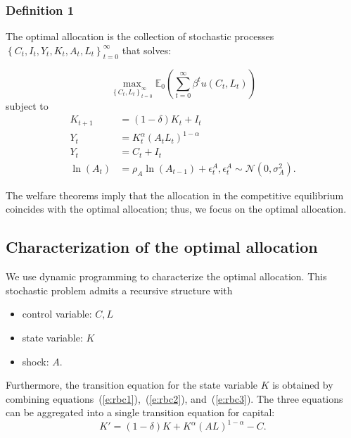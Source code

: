 \documentclass{article}
\begin{document}
\subsubsection*{Definition 1} The optimal allocation is the collection of stochastic processes $\left\lbrace C_{t},I_{t},Y_{t},K_{t},A_{t},L_{t}\right\rbrace _{t=0}^{\infty}$ that solves:

\[
\max_{\left\lbrace C_{t},L_{t}\right\rbrace _{t=0}^{\infty}} \mathbb{E}_{0}\left(\sum_{t=0}^{\infty}\beta^{t} u(C_{t},L_{t})\right)
\]
subject to
\wcSpan*[id=equation-23]{}
\setcounter{tpequation}{22}\label{e:rbc1}
\setcounter{tpequation}{23}\label{e:rbc2}
\setcounter{tpequation}{24}\label{e:rbc3}
\[
\begin{align*}
K_{t+1} &=(1-\delta) K_{t}+I_{t}\tag{23}\\
Y_{t}&=K_{t}^{\alpha} \left(A_{t} L_{t}\right)^{1-\alpha}\tag{24}\\
Y_{t}&=C_{t}+I_{t}\tag{25}\\
\ln\left(A_{t}\right) &=\rho_{A} \ln\left(A_{t-1}\right) +\epsilon^{A}_{t}, \epsilon^{A}_{t}\sim \mathcal{N}\left(0,\sigma_{A}^{2}\right).
\end{align*}
\]

The welfare theorems imply that the allocation in the competitive equilibrium coincides with the optimal allocation; thus, we focus on the optimal allocation.

\subsection{Characterization of the optimal allocation}

We use dynamic programming to characterize the optimal allocation. This stochastic problem admits a recursive structure with
\begin{itemize}
\item control variable: $C,L$
\item state variable: $K$
\item shock: $A$.
\end{itemize}
Furthermore, the transition equation for the state variable $K$ is obtained by combining equations~(\ref{e:rbc1}),~(\ref{e:rbc2}), and~(\ref{e:rbc3}). The three equations can be aggregated into a single transition equation for capital:
\wcSpan*[id=equation-26]{}
\setcounter{tpequation}{25}\label{e:rbctrans}
\[
K'=(1-\delta) K+K^{\alpha} (A L)^{1-\alpha}-C.\tag{26}
\]
\end{document}
